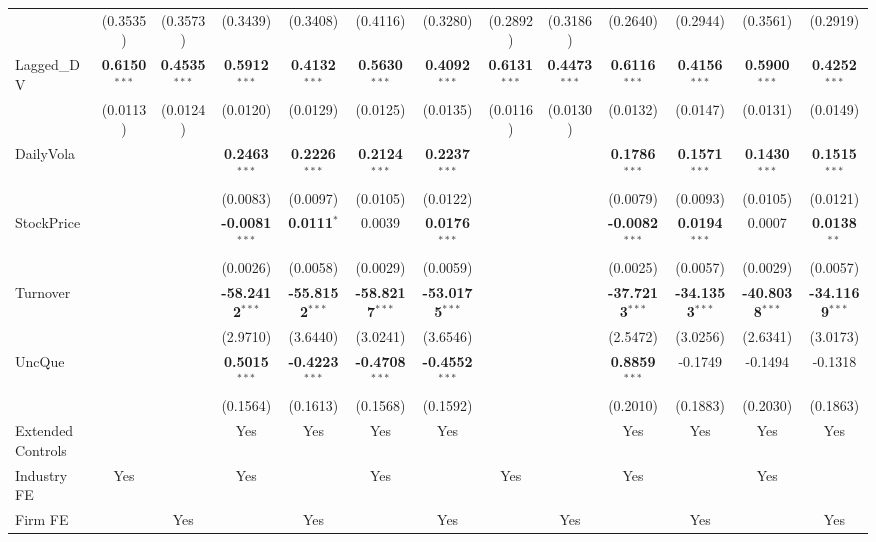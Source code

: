 \begin{landscape}
\begin{table}[H]
\begin{tabular}{lcccccccccccc}
 & (0.3535) & (0.3573) & (0.3439) & (0.3408) & (0.4116) & (0.3280) & (0.2892) & (0.3186) & (0.2640) & (0.2944) & (0.3561) & (0.2919) \\
Lagged\_DV & \textbf{0.6150}$^{***}$ & \textbf{0.4535}$^{***}$ & \textbf{0.5912}$^{***}$ & \textbf{0.4132}$^{***}$ & \textbf{0.5630}$^{***}$ & \textbf{0.4092}$^{***}$ & \textbf{0.6131}$^{***}$ & \textbf{0.4473}$^{***}$ & \textbf{0.6116}$^{***}$ & \textbf{0.4156}$^{***}$ & \textbf{0.5900}$^{***}$ & \textbf{0.4252}$^{***}$ \\
 & (0.0113) & (0.0124) & (0.0120) & (0.0129) & (0.0125) & (0.0135) & (0.0116) & (0.0130) & (0.0132) & (0.0147) & (0.0131) & (0.0149) \\
DailyVola &  &  & \textbf{0.2463}$^{***}$ & \textbf{0.2226}$^{***}$ & \textbf{0.2124}$^{***}$ & \textbf{0.2237}$^{***}$ &  &  & \textbf{0.1786}$^{***}$ & \textbf{0.1571}$^{***}$ & \textbf{0.1430}$^{***}$ & \textbf{0.1515}$^{***}$ \\
 &  &  & (0.0083) & (0.0097) & (0.0105) & (0.0122) &  &  & (0.0079) & (0.0093) & (0.0105) & (0.0121) \\
StockPrice &  &  & \textbf{-0.0081}$^{***}$ & \textbf{0.0111}$^{*}$ & 0.0039 & \textbf{0.0176}$^{***}$ &  &  & \textbf{-0.0082}$^{***}$ & \textbf{0.0194}$^{***}$ & 0.0007 & \textbf{0.0138}$^{**}$ \\
 &  &  & (0.0026) & (0.0058) & (0.0029) & (0.0059) &  &  & (0.0025) & (0.0057) & (0.0029) & (0.0057) \\
Turnover &  &  & \textbf{-58.2412}$^{***}$ & \textbf{-55.8152}$^{***}$ & \textbf{-58.8217}$^{***}$ & \textbf{-53.0175}$^{***}$ &  &  & \textbf{-37.7213}$^{***}$ & \textbf{-34.1353}$^{***}$ & \textbf{-40.8038}$^{***}$ & \textbf{-34.1169}$^{***}$ \\
 &  &  & (2.9710) & (3.6440) & (3.0241) & (3.6546) &  &  & (2.5472) & (3.0256) & (2.6341) & (3.0173) \\
UncQue &  &  & \textbf{0.5015}$^{***}$ & \textbf{-0.4223}$^{***}$ & \textbf{-0.4708}$^{***}$ & \textbf{-0.4552}$^{***}$ &  &  & \textbf{0.8859}$^{***}$ & -0.1749 & -0.1494 & -0.1318 \\
 &  &  & (0.1564) & (0.1613) & (0.1568) & (0.1592) &  &  & (0.2010) & (0.1883) & (0.2030) & (0.1863) \\
\midrule
Extended Controls &  &  & Yes & Yes & Yes & Yes &  &  & Yes & Yes & Yes & Yes \\
Industry FE & Yes &  & Yes &  & Yes &  & Yes &  & Yes &  & Yes &  \\
Firm FE &  & Yes &  & Yes &  & Yes &  & Yes &  & Yes &  & Yes \\

\end{tabular}
\end{table}
\end{landscape}
